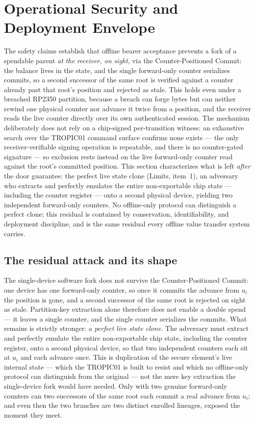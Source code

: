 \documentclass[11pt]{article}
\theoremstyle{definition}
\theoremstyle{remark}
\begin{document}
\section{Operational Security and Deployment Envelope}

The safety claims establish that offline bearer acceptance prevents a fork of a spendable parent
\emph{at the receiver, on sight}, via the Counter-Positioned Commit: the balance lives in the state,
and the single forward-only counter serializes commits, so a second successor of the same root is
verified against a counter already past that root's position and rejected as stale. This holds even
under a breached RP2350 partition, because a breach can forge bytes but can neither rewind one physical
counter nor advance it twice from a position, and the receiver reads the live counter directly over its
own authenticated session. The mechanism deliberately does not rely on a chip-signed per-transition
witness: an exhaustive search over the TROPIC01 command surface confirms none exists --- the only
receiver-verifiable signing operation is repeatable, and there is no counter-gated signature --- so
exclusion rests instead on the live forward-only counter read against the root's committed position. This section
characterizes what is left \emph{after} the door guarantee: the perfect live state clone (Limits,
item~1), an adversary who extracts and perfectly emulates the entire non-exportable chip state ---
including the counter register --- onto a second physical device, yielding two independent forward-only
counters. No offline-only protocol can distinguish a perfect clone; this residual is contained by
conservation, identifiability, and deployment discipline, and is the same residual every offline value
transfer system carries.

\subsection{The residual attack and its shape}

The single-device software fork does not survive the Counter-Positioned Commit: one device has one
forward-only counter, so once it commits the advance from \(u_i\) the position is gone, and a second
successor of the same root is rejected on sight as stale. Partition-key extraction alone therefore
does not enable a double spend --- it leaves a single counter, and the single counter serializes the
commits. What remains is strictly stronger: a \emph{perfect live state clone}. The adversary must
extract and perfectly emulate the entire non-exportable chip state, including the counter register,
onto a second physical device, so that two independent counters each sit at \(u_i\) and each advance
once. This is duplication of the secure element's live internal state --- which the TROPIC01 is built
to resist and which no offline-only protocol can distinguish from the original --- not the mere key
extraction the single-device fork would have needed. Only with two genuine forward-only counters can
two successors of the same root each commit a real advance from \(u_i\); and even then the two
branches are two distinct enrolled lineages, exposed the moment they meet.
\end{document}
